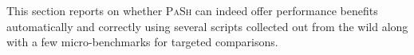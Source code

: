 \documentclass[sigplan, review, screen, anonymous]{acmart}
\newcommand{\TODO}[1]{\hl{\textbf{TODO:} #1}\xspace}
\newcommand{\kk}[1]{[{\color{magenta}kk: #1}]}
\newcommand{\sys}{{\scshape PaSh}\xspace}
\begin{document}
% 
% 
% 
% 
% 






This section reports on whether \sys can indeed offer performance benefits automatically and correctly using several scripts collected out from the wild along with a few micro-benchmarks for targeted comparisons.
\end{document}
